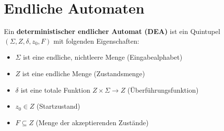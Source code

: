 \documentclass[14pt]{article}
\begin{document}
\section{Endliche Automaten}
\begin{definition}
    Ein \textbf{deterministischer endlicher Automat (DEA)} ist ein 
    Quintupel $(\varSigma, Z, \delta, z_0, F)$ mit folgenden Eigenschaften:
    \begin{itemize}
        \item $\varSigma$ ist eine endliche, nichtleere Menge (Eingabealphabet)
        \item $Z$ ist eine endliche Menge (Zustandsmenge)
        \item $\delta$ ist eine totale Funktion $Z \times \varSigma \rightarrow Z$
        (Überführungsfunktion)
        \item $z_0 \in Z$ (Startzustand)
        \item $F \subseteq Z$ (Menge der akzeptierenden Zustände)
    \end{itemize}
\end{definition}
\end{document}
